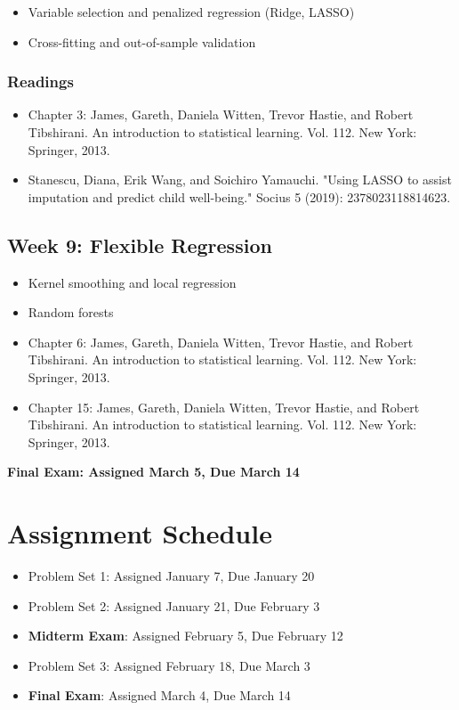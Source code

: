 \documentclass[11pt, article, oneside]{memoir}
\theoremstyle{Assumption}
\begin{document}
\begin{itemize}
\item Variable selection and penalized regression (Ridge, LASSO) 
\item Cross-fitting and out-of-sample validation
\end{itemize}

\subsubsection*{Readings}

\begin{itemize}
\item Chapter 3: James, Gareth, Daniela Witten, Trevor Hastie, and Robert Tibshirani. An introduction to statistical learning. Vol. 112. New York: Springer, 2013.
\item Stanescu, Diana, Erik Wang, and Soichiro Yamauchi. "Using LASSO to assist imputation and predict child well-being." Socius 5 (2019): 2378023118814623.
\end{itemize}

\subsection{Week 9: Flexible Regression}

\begin{itemize}
\item Kernel smoothing and local regression
\item Random forests
\end{itemize}

\begin{itemize}
\item Chapter 6: James, Gareth, Daniela Witten, Trevor Hastie, and Robert Tibshirani. An introduction to statistical learning. Vol. 112. New York: Springer, 2013.
\item Chapter 15: James, Gareth, Daniela Witten, Trevor Hastie, and Robert Tibshirani. An introduction to statistical learning. Vol. 112. New York: Springer, 2013.
\end{itemize}

\textbf{Final Exam: Assigned March 5, Due March 14}

\section*{Assignment Schedule}

\begin{itemize}
\item Problem Set 1: Assigned January 7, Due January 20
\item Problem Set 2: Assigned January 21, Due February 3
\item \textbf{Midterm Exam}: Assigned February 5, Due February 12
\item Problem Set 3: Assigned February 18, Due March 3
\item \textbf{Final Exam}: Assigned March 4, Due March 14
\end{itemize}
\end{document}
